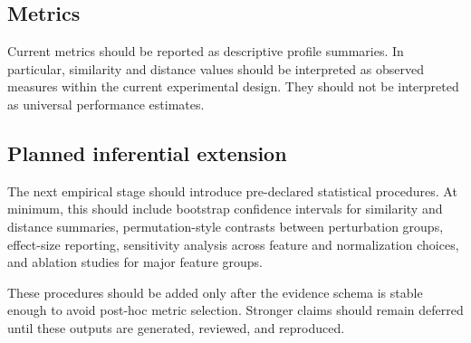 \subsection{Metrics}

Current metrics should be reported as descriptive profile summaries. In particular, similarity and distance values should be interpreted as observed measures within the current experimental design. They should not be interpreted as universal performance estimates.

\subsection{Planned inferential extension}

The next empirical stage should introduce pre-declared statistical procedures. At minimum, this should include bootstrap confidence intervals for similarity and distance summaries, permutation-style contrasts between perturbation groups, effect-size reporting, sensitivity analysis across feature and normalization choices, and ablation studies for major feature groups.

These procedures should be added only after the evidence schema is stable enough to avoid post-hoc metric selection. Stronger claims should remain deferred until these outputs are generated, reviewed, and reproduced.
